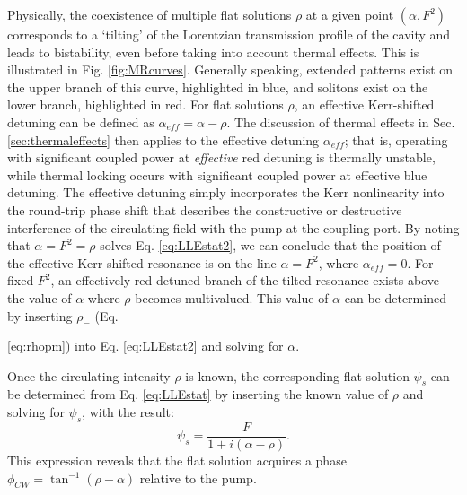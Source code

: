 Physically, the coexistence of multiple flat solutions $\rho$ at a given point $(\alpha,F^2)$ corresponds to a `tilting' of the Lorentzian transmission profile of the cavity and leads to bistability, even before taking into account thermal effects. This is illustrated in Fig. \ref{fig:MRcurves}. Generally speaking, extended patterns exist on the upper branch of this curve, highlighted in blue, and solitons exist on the lower branch, highlighted in red. For flat solutions $\rho$, an effective Kerr-shifted detuning can be defined as $\alpha_{eff}=\alpha-\rho$. The discussion of thermal effects in Sec. \ref{sec:thermaleffects} then applies to the effective detuning $\alpha_{eff}$; that is, operating with significant coupled power at \textit{effective} red detuning is thermally unstable, while thermal locking occurs with significant coupled power at effective blue detuning. The effective detuning simply incorporates the Kerr nonlinearity into the round-trip phase shift that describes the constructive or destructive interference of the circulating field with the pump at the coupling port. By noting that $\alpha=F^2=\rho$ solves Eq. \ref{eq:LLEstat2}, we can conclude that the position of the effective Kerr-shifted resonance is on the line $\alpha=F^2$, where $\alpha_{eff}=0$. For fixed $F^2$, an effectively red-detuned branch of the tilted resonance exists above the value of $\alpha$ where $\rho$ becomes multivalued. This value of $\alpha$ can be determined by inserting $\rho_-$ (Eq. {\ref{eq:rhopm}) into Eq. \ref{eq:LLEstat2} and solving for $\alpha$. 

Once the circulating intensity $\rho$ is known, the corresponding flat solution $\psi_s$ can be determined from Eq. \ref{eq:LLEstat} by inserting the known value of $\rho$ and solving for $\psi_s$, with the result:
\begin{equation}
\psi_s=\frac{F}{1+i(\alpha-\rho)}.\label{eq:LLEflatsoln}
\end{equation}
This expression reveals that the flat solution acquires a phase $\phi_{CW}=\tan^{-1}(\rho-\alpha)$ relative to the pump.



}
